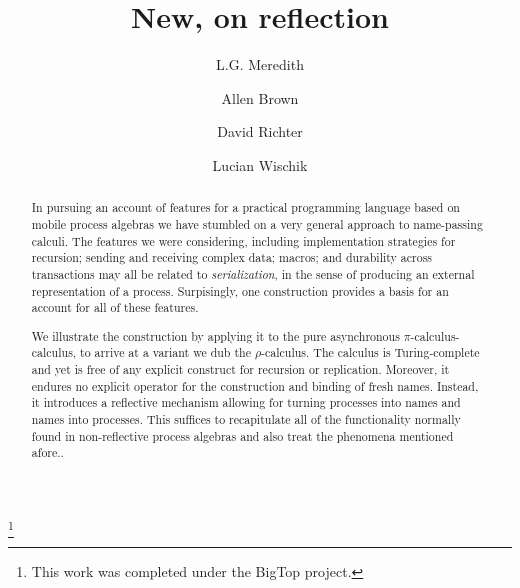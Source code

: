 \documentclass{amsart}
\theoremstyle{definition}
\theoremstyle{remark}
\numberwithin{equation}{subsection}
\newcommand{\pic}{$\pi$-calculus}
\newcommand{\papertitle}{New, on reflection}
\begin{document}
\setlength{\topmargin}{0in}
\setlength{\textheight}{8.5in}
\setlength{\parskip}{6pt}

\title{\huge{\papertitle}}

\author{ L.G. Meredith }

\author{ Allen Brown }

\author{ David Richter }

\author{ Lucian Wischik }



\thanks{This work was completed under the BigTop project.}




\dedicatory{}



\begin{abstract}
\normalsize{ 

In pursuing an account of features for a practical programming
language based on mobile process algebras we have stumbled on a very
general approach to name-passing calculi. The features we were
considering, including implementation strategies for recursion; sending and
receiving complex data; macros; and durability across transactions may
all be related to \textit{serialization}, in the sense of producing an
external representation of a process. Surpisingly, one construction
provides a basis for an account for all of these features.

We illustrate the construction by applying it to the pure asynchronous
\pic-calculus, to arrive at a variant we dub the $\rho$-calculus. The
calculus is Turing-complete and yet is free of any explicit construct
for recursion or replication. Moreover, it endures no explicit
operator for the construction and binding of fresh names. Instead, it
introduces a reflective mechanism allowing for turning processes into
names and names into processes. This suffices to recapitulate all of
the functionality normally found in non-reflective process algebras
and also treat the phenomena mentioned afore..

}

\end{abstract}
\end{document}

